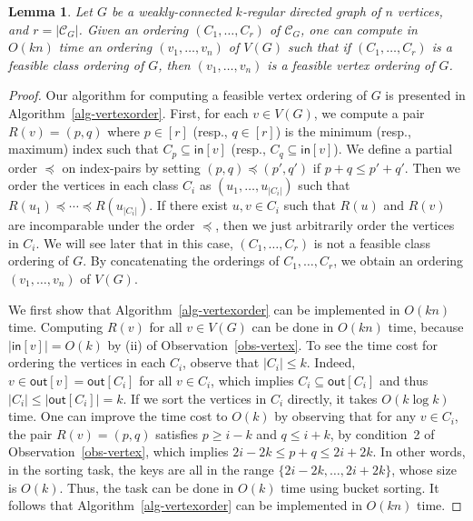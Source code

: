 \documentclass[11pt]{article}
\newtheorem{lemma}{Lemma}
\begin{document}
\begin{lemma} \label{lem-vertexorder}
    Let $G$ be a weakly-connected $k$-regular directed graph of $n$ vertices, and $r = |\mathcal{C}_G|$.
    Given an ordering $(C_1,\dots,C_r)$ of $\mathcal{C}_G$, one can compute in $O(kn)$ time an ordering $(v_1,\dots,v_n)$ of $V(G)$ such that if $(C_1,\dots,C_r)$ is a feasible class ordering of $G$, then $(v_1,\dots,v_n)$ is a feasible vertex ordering of $G$.
\end{lemma}
\begin{proof}
Our algorithm for computing a feasible vertex ordering of $G$ is presented in Algorithm~\ref{alg-vertexorder}.
First, for each $v \in V(G)$, we compute a pair $R(v) = (p,q)$ where $p \in [r]$ (resp., $q \in [r]$) is the minimum (resp., maximum) index such that $C_p \subseteq \mathsf{in}[v]$ (resp., $C_q \subseteq \mathsf{in}[v]$).
We define a partial order $\preceq$ on index-pairs by setting $(p,q) \preceq (p',q')$ if $p+q \leq p'+q'$.
Then we order the vertices in each class $C_i$ as $(u_1,\dots,u_{|C_i|})$ such that $R(u_1) \preceq \cdots \preceq R(u_{|C_i|})$.
If there exist $u,v \in C_i$ such that $R(u)$ and $R(v)$ are incomparable under the order $\preceq$, then we just arbitrarily order the vertices in $C_i$.
We will see later that in this case, $(C_1,\dots,C_r)$ is not a feasible class ordering of $G$.
By concatenating the orderings of $C_1,\dots,C_r$, we obtain an ordering $(v_1,\dots,v_n)$ of $V(G)$.

We first show that Algorithm~\ref{alg-vertexorder} can be implemented in $O(kn)$ time.
Computing $R(v)$ for all $v \in V(G)$ can be done in $O(kn)$ time, because $|\mathsf{in}[v]| = O(k)$ by (ii) of Observation~\ref{obs-vertex}.
To see the time cost for ordering the vertices in each $C_i$, observe that $|C_i| \leq k$.
Indeed, $v \in \mathsf{out}[v] = \mathsf{out}[C_i]$ for all $v \in C_i$, which implies $C_i \subseteq \mathsf{out}[C_i]$ and thus $|C_i| \leq |\mathsf{out}[C_i]| = k$.
If we sort the vertices in $C_i$ directly, it takes $O(k \log k)$ time.
One can improve the time cost to $O(k)$ by observing that for any $v \in C_i$, the pair $R(v) = (p,q)$ satisfies $p \geq i-k$ and $q \leq i+k$, by condition~2 of Observation~\ref{obs-vertex}, which implies $2i-2k \leq p+q \leq 2i+2k$.
In other words, in the sorting task, the keys are all in the range $\{2i-2k,\dots,2i+2k\}$, whose size is $O(k)$.
Thus, the task can be done in $O(k)$ time using bucket sorting.
It follows that Algorithm~\ref{alg-vertexorder} can be implemented in $O(kn)$ time.


\end{proof}
\end{document}
